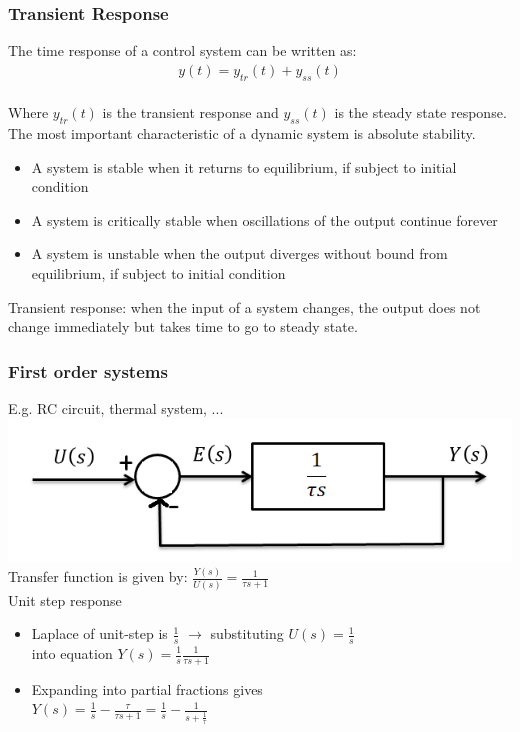 \begin{frame}
\frametitle{Transient Response}
The time response of a control system can be written as:
\begin{align*}
y(t) = y_{tr}(t) + y_{ss}(t)
\end{align*}
\\Where $y_{tr}(t)$ is the transient response and $y_{ss}(t)$ is the steady state response.
The most important characteristic of a dynamic system is absolute stability.
\begin{itemize}
\item A system is stable when it returns to equilibrium, if subject to initial condition
\item A system is critically stable when oscillations of the output continue forever
\item A system is unstable when the output diverges without bound from equilibrium, if subject to initial condition
\end{itemize}
Transient response: when the input of a system changes, the output does not change immediately but takes time to go to steady state.
\end{frame}

\begin{frame}
\frametitle{First order systems}
E.g. RC circuit, thermal system, ...
\vspace{0.15cm}
\\ \includegraphics[width=0.6\linewidth]{Afbeelding1}
\vspace{0.15cm}
\\Transfer function is given by: $\frac{Y(s)}{U(s)} = \frac{1}{\tau s +1}$
\vspace{0.15cm}
\\Unit step response
\begin{itemize}
\vspace{0.15cm}
\item Laplace of unit-step is $\frac{1}{s}$ $\rightarrow$ substituting $U(s)= \frac{1}{s}$ \\
\vspace{0.15cm}
into equation $Y(s) = \frac{1}{s}\frac{1}{\tau s +1}$
\vspace{0.15cm}
\item Expanding into partial fractions gives
\vspace{0.15cm}
\\ $Y(s)= \frac{1}{s} - \frac{\tau}{\tau s +1} = \frac{1}{s} - \frac{1}{s+\frac{1}{\tau}}$
\end{itemize}
\end{frame}

